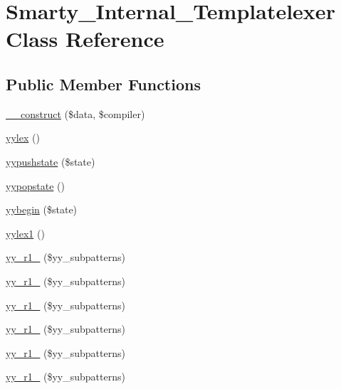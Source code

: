 \hypertarget{class_smarty___internal___templatelexer}{}\section{Smarty\+\_\+\+Internal\+\_\+\+Templatelexer Class Reference}
\label{class_smarty___internal___templatelexer}
\subsection*{Public Member Functions}
\begin{DoxyCompactItemize}
\item 
\hyperlink{class_smarty___internal___templatelexer_a738a83e9895ee0e04ca84875d2ea1352}{\+\_\+\+\_\+construct} (\$data, \$compiler)
\item 
\hyperlink{class_smarty___internal___templatelexer_a309773bdd56fc4ec055dac74de293720}{yylex} ()
\item 
\hyperlink{class_smarty___internal___templatelexer_a3f589601a8607062bb1b2c467e29d4a0}{yypushstate} (\$state)
\item 
\hyperlink{class_smarty___internal___templatelexer_a83163db45dd2973f2ecaf43fdf13d769}{yypopstate} ()
\item 
\hyperlink{class_smarty___internal___templatelexer_a05802d06c22e5606d359fac44761518e}{yybegin} (\$state)
\item 
\hyperlink{class_smarty___internal___templatelexer_a31f6b47c2d186d3c9a744331907edaec}{yylex1} ()
\item 
\hyperlink{class_smarty___internal___templatelexer_a57272ad98ad178dc2bdd2b151e41f774}{yy\+\_\+r1\+\_} (\$yy\+\_\+subpatterns)
\item 
\hyperlink{class_smarty___internal___templatelexer_a8870a63a8d9bea3a566fc0855eddb53e}{yy\+\_\+r1\+\_} (\$yy\+\_\+subpatterns)
\item 
\hyperlink{class_smarty___internal___templatelexer_a1e63864c06e0030cff00183953f1ce49}{yy\+\_\+r1\+\_} (\$yy\+\_\+subpatterns)
\item 
\hyperlink{class_smarty___internal___templatelexer_adc85748c3f8e8384d5a9d1732d5a02e1}{yy\+\_\+r1\+\_} (\$yy\+\_\+subpatterns)
\item 
\hyperlink{class_smarty___internal___templatelexer_a88a2715c9566987f9945142946dba9b6}{yy\+\_\+r1\+\_} (\$yy\+\_\+subpatterns)
\item 
\hyperlink{class_smarty___internal___templatelexer_aa0783d446b06c04227930f7cbca96b4c}{yy\+\_\+r1\+\_} (\$yy\+\_\+subpatterns)

\end{DoxyCompactItemize}
